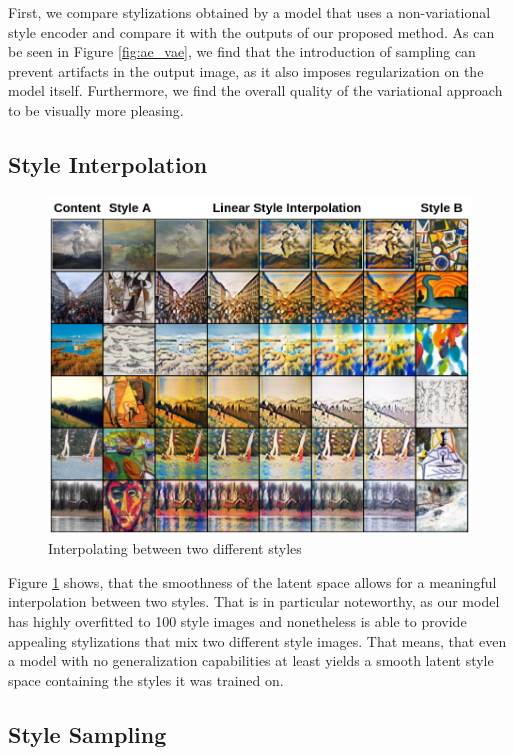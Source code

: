 \documentclass[10pt,twocolumn,letterpaper]{article}
\begin{document}
First, we compare stylizations obtained by a model that uses a non-variational style encoder and compare it with the outputs of our proposed method. As can be seen in Figure \ref{fig:ae_vae}, we find that the introduction of sampling can prevent artifacts in the output image, as it also imposes regularization on the model itself. Furthermore, we find the overall quality of the variational approach to be visually more pleasing.

\subsection{Style Interpolation}

\begin{figure}
\centering
\includegraphics[width=0.9\linewidth]{interpolation.png}
\caption{Interpolating between two different styles}
\label{fig:interpolation}
\end{figure}

Figure \ref{fig:interpolation} shows, that the smoothness of the latent space allows for a meaningful interpolation between two styles. That is in particular noteworthy, as our model has highly overfitted to 100 style images and nonetheless is able to provide appealing stylizations that mix two different style images. That means, that even a model with no generalization capabilities at least yields a smooth latent style space containing the styles it was trained on.

\subsection{Style Sampling}
\end{document}
